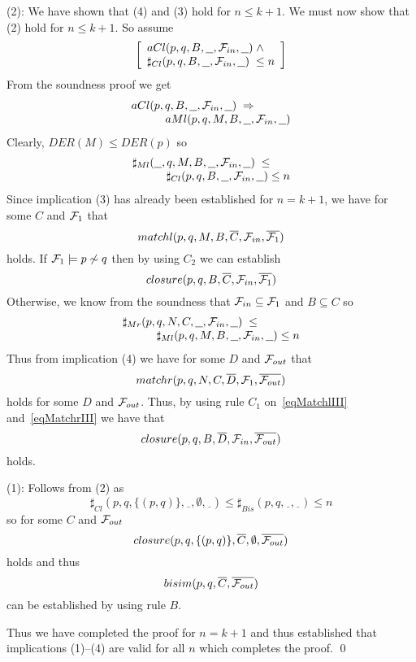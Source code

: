 \begin{theorem}
\item[\rm (2):] 
We have shown that (4) and (3) hold for $n\leq k+1$. We must now show that (2) hold for $n\leq k+1$. So assume
\[
\left[\begin{array}{l}
aCl(p,q,B,\underline{\ \ },{\cal F}_{in},\underline{\ \ })\;\wedge\\
\sharp_{Cl}(p,q,B,\underline{\ \ },{\cal F}_{in},\underline{\ \ })\;\leq n
\end{array}\right]
\]
From the soundness proof we get
\[
\begin{array}{llll}
\multicolumn{4}{l}{aCl(p,q,B,\underline{\ \ },{\cal F}_{in},\underline{\ \ })\;\Rightarrow}\\
&&& aMl(p,q,M,B,\underline{\ \ },{\cal F}_{in},\underline{\ \ })
\end{array}
\]
Clearly, $DER(M)\leq DER(p)$ so
\[
\begin{array}{llll}
\multicolumn{4}{l}{\sharp_{Ml}(\underline{\ \ },q,M,B,\underline{\ \ },{\cal F}_{in},\underline{\ \ })\;\leq}\\
&&&\sharp_{Cl}(p,q,B,\underline{\ \ },{\cal F}_{in},\underline{\ \ }) \leq n
\end{array}
\]
Since implication (3) has already been established for $n=k+1$, we have for some $C$ and ${\cal F}_{1}$ that
\begin{equation}\label{eqMatchlIII}
matchl(p,q,M,B,\overline{C},{\cal F}_{in},\overline{{\cal F}_{1}})
\end{equation}
holds. If ${\cal F}_{1}\models p\not\sim q$ then by using $C_2$ we can establish
\[
closure(p,q,B,\overline{C},{\cal F}_{in},\overline{{\cal F}_{1}})
\]
Otherwise, we know from the soundness that ${\cal F}_{in}\subseteq{\cal F}_{1}$ and $B\subseteq C$ so
\[
\begin{array}{llll}
\multicolumn{4}{l}{\sharp_{Mr}(p,q,N,C,\underline{\ \ },{\cal F}_{in},\underline{\ \ })\;\leq}\\
&&&\sharp_{Ml}(p,q,M,B,\underline{\ \ },{\cal F}_{in},\underline{\ \ }) \leq n
\end{array}
\]
Thus from implication (4) we have for some $D$ and ${\cal F}_{out}$ that
\begin{equation}\label{eqMatchrIII}
matchr(p,q,N,C,\overline{D},{\cal F}_{1},\overline{{\cal F}_{out}})
\end{equation}
holds for some $D$ and ${\cal F}_{out}$. Thus, by using rule $C_1$ on~\ref{eqMatchlIII} and~\ref{eqMatchrIII} we have that
\[
closure(p,q,B,\overline{D},{\cal F}_{in},\overline{{\cal F}_{out}})
\]
holds.

\item[\rm (1):] 
Follows from (2) as
\[
\sharp_{Cl}(p,q,\{(p,q)\},\underline{\ \ },\emptyset,\underline{\ \ }) \leq
\sharp_{Bis}(p,q,\underline{\ \ },\underline{\ \ }) \leq n
\]
so for some  $C$ and ${\cal F}_{out}$
\[
closure(p,q,\{(p,q)\},\overline{C},\emptyset,\overline{{\cal F}_{out}})
\]
holds and thus
\[
bisim(p,q,\overline{C},\overline{{\cal F}_{out}})
\]
can be established by using rule $B$.

\noindent
Thus we have completed the proof for $n=k+1$ and thus established that implications (1)--(4) are valid for all $n$ which completes the proof.
\qed
\end{theorem}

